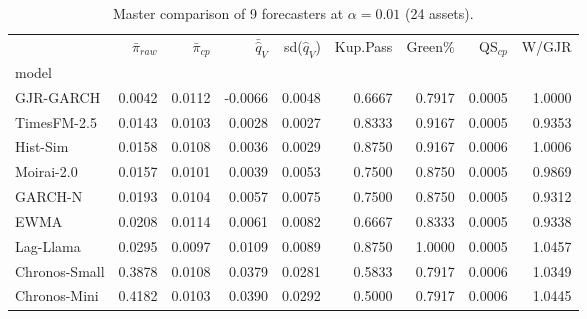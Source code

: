 \begin{table}[htbp]
\centering
\caption{Master comparison of 9 forecasters at $\alpha=0.01$ (24 assets).}
\label{tab:master}
\footnotesize
\begin{tabular}{lrrrrrrrr}
\toprule
 & $\bar{\pi}_{raw}$ & $\bar{\pi}_{cp}$ & $\bar{\hat{q}}_V$ & sd($\hat{q}_V$) & Kup.Pass & Green\% & QS$_{cp}$ & W/GJR \\
model &  &  &  &  &  &  &  &  \\
\midrule
GJR-GARCH & 0.0042 & 0.0112 & -0.0066 & 0.0048 & 0.6667 & 0.7917 & 0.0005 & 1.0000 \\
TimesFM-2.5 & 0.0143 & 0.0103 & 0.0028 & 0.0027 & 0.8333 & 0.9167 & 0.0005 & 0.9353 \\
Hist-Sim & 0.0158 & 0.0108 & 0.0036 & 0.0029 & 0.8750 & 0.9167 & 0.0006 & 1.0006 \\
Moirai-2.0 & 0.0157 & 0.0101 & 0.0039 & 0.0053 & 0.7500 & 0.8750 & 0.0005 & 0.9869 \\
GARCH-N & 0.0193 & 0.0104 & 0.0057 & 0.0075 & 0.7500 & 0.8750 & 0.0005 & 0.9312 \\
EWMA & 0.0208 & 0.0114 & 0.0061 & 0.0082 & 0.6667 & 0.8333 & 0.0005 & 0.9338 \\
Lag-Llama & 0.0295 & 0.0097 & 0.0109 & 0.0089 & 0.8750 & 1.0000 & 0.0005 & 1.0457 \\
Chronos-Small & 0.3878 & 0.0108 & 0.0379 & 0.0281 & 0.5833 & 0.7917 & 0.0006 & 1.0349 \\
Chronos-Mini & 0.4182 & 0.0103 & 0.0390 & 0.0292 & 0.5000 & 0.7917 & 0.0006 & 1.0445 \\
\bottomrule
\end{tabular}
\end{table}
